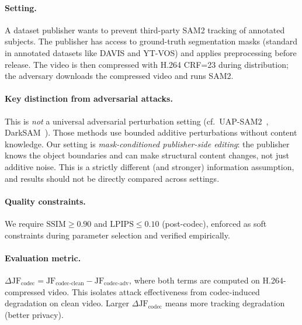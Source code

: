 \paragraph{Setting.}
A dataset publisher wants to prevent third-party SAM2 tracking of annotated subjects.
The publisher has access to ground-truth segmentation masks (standard in annotated datasets like DAVIS and YT-VOS) and applies preprocessing before release.
The video is then compressed with H.264 CRF=23 during distribution; the adversary downloads the compressed video and runs SAM2.

\paragraph{Key distinction from adversarial attacks.}
This is \emph{not} a universal adversarial perturbation setting (cf.\ UAP-SAM2~\citep{uap_sam2_2025}, DarkSAM~\citep{darksam2024}).
Those methods use bounded additive perturbations without content knowledge.
Our setting is \emph{mask-conditioned publisher-side editing}: the publisher knows the object boundaries and can make structural content changes, not just additive noise.
This is a strictly different (and stronger) information assumption, and results should not be directly compared across settings.

\paragraph{Quality constraints.}
We require $\mathrm{SSIM} \geq 0.90$ and $\mathrm{LPIPS} \leq 0.10$ (post-codec), enforced as soft constraints during parameter selection and verified empirically.

\paragraph{Evaluation metric.}
$\Delta\mathrm{JF}_\mathrm{codec} = \mathrm{JF}_\mathrm{codec\text{-}clean} - \mathrm{JF}_\mathrm{codec\text{-}adv}$, where both terms are computed on H.264-compressed video.
This isolates attack effectiveness from codec-induced degradation on clean video.
Larger $\Delta\mathrm{JF}_\mathrm{codec}$ means more tracking degradation (better privacy).
